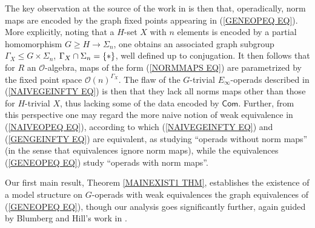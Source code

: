 \documentclass[a4paper,10pt]{article}%
\begin{document}
The key observation at the source of the work in 
\cite{BH15} is then that, operadically, 
norm maps are encoded by the graph fixed points 
appearing in (\ref{GENEOPEQ EQ}).
More explicitly, noting that a $H$-set $X$ with $n$ elements 
is encoded by a partial homomorphism 
$G \geq H \to \Sigma_n$, 
one obtains an associated graph subgroup 
$\Gamma_X \leq G \times \Sigma_n$, 
$\Gamma_X \cap \Sigma_n =\{\**\}$, well defined up to conjugation. It then follows that for $R$ an 
$\mathcal{O}$-algebra, maps of the form (\ref{NORMMAPS EQ})
are parametrized by the fixed point space
$\mathcal{O}(n)^{\Gamma_X}$.
The flaw of the $G$-trivial $E_{\infty}$-operads
described in (\ref{NAIVEGEINFTY EQ}) is then that they lack all norms maps other than those for $H$-trivial $X$, thus lacking 
some of the data encoded by $\mathsf{Com}$.
Further, from this perspective one may regard the more naive notion of weak equivalence in (\ref{NAIVEOPEQ EQ}),
according to which (\ref{NAIVEGEINFTY EQ}) and (\ref{GENGEINFTY EQ}) are equivalent,
as studying ``operads without norm maps''
(in the sense that equivalences ignore norm maps), 
while the equivalences (\ref{GENEOPEQ EQ})
study ``operads with norm maps''.

Our first main result, Theorem \ref{MAINEXIST1 THM}, 
establishes the existence of a model structure on $G$-operads with weak equivalences the graph equivalences of (\ref{GENEOPEQ EQ}),
though our analysis goes significantly further, again guided by Blumberg and Hill's work in \cite{BH15}.
\end{document}

